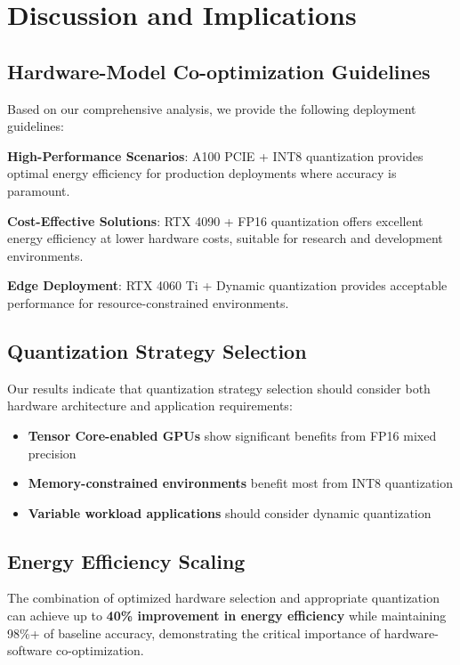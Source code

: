 \documentclass[sigconf]{acmart}
\begin{document}
\section{Discussion and Implications}

\subsection{Hardware-Model Co-optimization Guidelines}

Based on our comprehensive analysis, we provide the following deployment guidelines:

\textbf{High-Performance Scenarios}: A100 PCIE + INT8 quantization provides optimal energy efficiency for production deployments where accuracy is paramount.

\textbf{Cost-Effective Solutions}: RTX 4090 + FP16 quantization offers excellent energy efficiency at lower hardware costs, suitable for research and development environments.

\textbf{Edge Deployment}: RTX 4060 Ti + Dynamic quantization provides acceptable performance for resource-constrained environments.

\subsection{Quantization Strategy Selection}

Our results indicate that quantization strategy selection should consider both hardware architecture and application requirements:

\begin{itemize}
\item \textbf{Tensor Core-enabled GPUs} show significant benefits from FP16 mixed precision
\item \textbf{Memory-constrained environments} benefit most from INT8 quantization
\item \textbf{Variable workload applications} should consider dynamic quantization
\end{itemize}

\subsection{Energy Efficiency Scaling}

The combination of optimized hardware selection and appropriate quantization can achieve up to \textbf{40\% improvement in energy efficiency} while maintaining 98\%+ of baseline accuracy, demonstrating the critical importance of hardware-software co-optimization.
\end{document}
